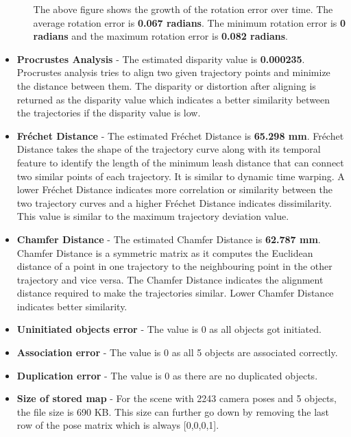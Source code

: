 \documentclass[report.tex]{subfiles}
\begin{document}
\begin{itemize}
\begin{itemize}
The above figure shows the growth of the rotation error over time. The average rotation error is \textbf{0.067 radians}. The minimum rotation error is \textbf{0 radians} and the maximum rotation error is \textbf{0.082 radians}.
    \end{itemize}
    \item \textbf{Procrustes Analysis} - The estimated disparity value is \textbf{0.000235}. Procrustes analysis tries to align two given trajectory points and minimize the distance between them. The disparity or distortion after aligning is returned as the disparity value which indicates a better similarity between the trajectories if the disparity value is low. 
    \item \textbf{Fréchet Distance} - The estimated Fréchet Distance is \textbf{65.298 mm}. Fréchet Distance takes the shape of the trajectory curve along with its temporal feature to identify the length of the minimum leash distance that can connect two similar points of each trajectory. It is similar to dynamic time warping.  A lower Fréchet Distance indicates more correlation or similarity between the two trajectory curves and a higher Fréchet Distance indicates dissimilarity. This value is similar to the maximum trajectory deviation value.
    \item \textbf{Chamfer Distance} - The estimated Chamfer Distance is \textbf{62.787 mm}. Chamfer Distance is a symmetric matrix as it computes the Euclidean distance of a point in one trajectory to the neighbouring point in the other trajectory and vice versa. The Chamfer Distance indicates the alignment distance required to make the trajectories similar. Lower Chamfer Distance indicates better similarity.
    \item \textbf{Uninitiated objects error} - The value is 0 as all objects got initiated.
    \item \textbf{Association error} - The value is 0 as all 5 objects are associated correctly.
    \item \textbf{Duplication error} - The value is 0 as there are no duplicated objects.
    \item \textbf{Size of stored map} - For the scene with 2243 camera poses and 5 objects, the file size is 690 KB. This size can further go down by removing the last row of the pose matrix which is always [0,0,0,1].
    
\end{itemize}
\end{document}
